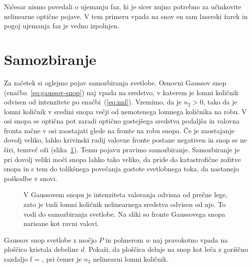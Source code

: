\begin{remark}
Ničesar nismo povedali o ujemanju faz, ki je sicer nujno potrebno za učinkovite nelinearne 
optične pojave. V tem primeru vpada na snov en sam laserski žarek in pogoj ujemanja faz
je vedno izpolnjen. 
\end{remark}

\section{Samozbiranje}
Za začetek si oglejmo pojav samozbiranja svetlobe. Osnovni Gaussov snop 
(enačba~\ref{eq:gaussov-snop}) naj vpada na sredstvo,
v katerem je lomni količnik odvisen od intenzitete po enačbi~(\ref{eq:nnl}).
Vzemimo, da je $n_{2}>0$, tako da je lomni količnik v sredini snopa večji 
od nemotenega lomnega količnika na robu. V osi snopa se optična pot 
zaradi optično gostejšega sredstva podaljša in valovna fronta začne
v osi zaostajati glede na fronte na robu snopa. Če je zaostajanje dovolj veliko,
lahko krivinski radij valovne fronte postane negativen in snop se
ne širi, temveč oži (slika~\ref{fig:sf1}). Temu pojavu pravimo 
samozbiranje. Samozbiranje je pri dovolj
veliki moči snopa lahko tako veliko, da pride do katastrofične zožitve snopa
in s tem do tolikšnega povečanja gostote svetlobnega toka, da nastanejo
poškodbe v snovi.
\begin{figure}[h]
\centering
\def\svgwidth{100truemm} 

\caption{V Gaussovem snopu je intenziteta valovanja odvisna od prečne lege, zato
 je tudi lomni količnik nelinearnega sredstva odvisen od nje. To vodi do 
 samozbiranja svetlobe. Na sliki so fronte Gaussovega snopa narisane kot ravni valovi.}
\label{fig:sf1}
\end{figure}

\begin{definition}
Gaussov snop svetlobe z močjo $P$ in polmerom $w$ naj pravokotno vpada na ploščico
kristala debeline $d$. Pokaži, da ploščica deluje na snop kot leča z goriščno razdaljo 
\beq
f = ,
\eeq
pri čemer je $n_2$ nelinearni lomni količnik.
\end{definition}

